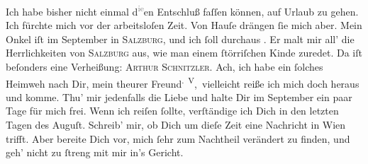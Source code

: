 \pstart
           Ich habe bisher nicht einmal d\substVorne{}\textsuperscript{\textcolor{gray}{ie}}\substDazwischen{}en\substHinten{} Entschluß faſſen können, auf Urlaub zu gehen. {\pb}Ich fürchte mich vor der arbeitsloſen Zeit. Von
               Hauſe drängen{ }ſie mich aber. Mein Onkel iſt im September in \textsc{Salzburg}, und ich{ }ſoll durchaus \label{K_L02711-2v}\label{K_L02711-2}. Er malt mir all’ die Herrlichkeiten von \textsc{Salzburg} aus, wie man einem{ }ſtörriſchen Kinde zuredet. Da iſt beſonders eine Verheißung:
                  \textsc{Arthur Schnitzler}. Ach, ich habe ein{ }ſolches Heimweh
               nach Dir, mein theurer Freund\substVorne{}\textsuperscript{. V}\substDazwischen{}, v\substHinten{}ielleicht reiße ich mich doch heraus und komme. Thu’ mir jedenfalls die Liebe
               und halte Dir im September ein paar Tage für mich frei.
               Wenn ich reiſen{ }ſollte, verſtändige ich Dich {\pb}in den
               letzten Tagen des Auguſt. Schreib’ mir, ob Dich um dieſe
               Zeit eine Nachricht in Wien trifft. Aber bereite
               Dich vor, mich{ }ſehr zum Nachtheil verändert zu finden, und geh’ nicht zu{ }ſtreng mit
               mir in’s Gericht.\pend
           
